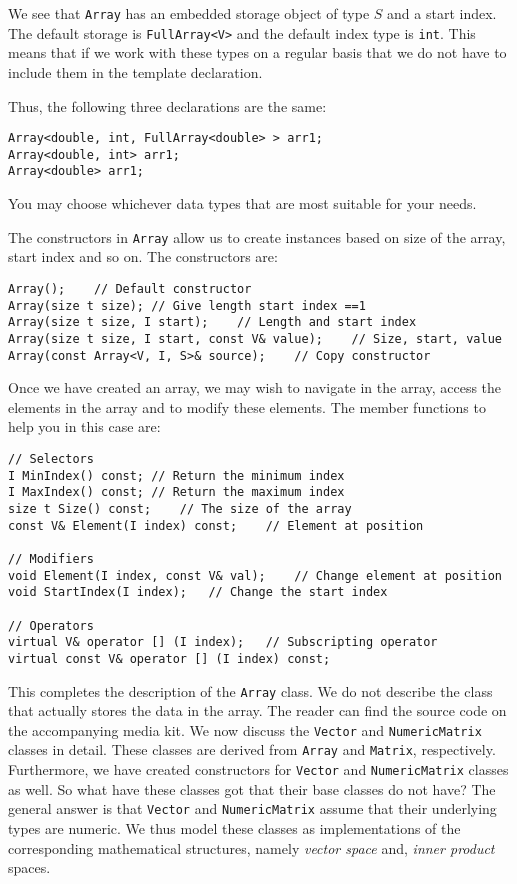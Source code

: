 We see that \texttt{Array} has an embedded storage object of type $S$ and a start index. The default storage is \texttt{FullArray<V>} and the default index type is \texttt{int}. This means that if we work with these types on a regular basis that we do not have to include them in the template declaration.

Thus, the following three declarations are the same:
\begin{lstlisting}
Array<double, int, FullArray<double> > arr1;
Array<double, int> arr1;
Array<double> arr1;
\end{lstlisting}

You may choose whichever data types that are most suitable for your needs.

The constructors in \texttt{Array} allow us to create instances based on size of the array, start index and so on. The constructors are:

\begin{lstlisting}
Array();	// Default constructor
Array(size t size);	// Give length start index ==1
Array(size t size, I start);	// Length and start index
Array(size t size, I start, const V& value);	// Size, start, value
Array(const Array<V, I, S>& source);	// Copy constructor
\end{lstlisting}

Once we have created an array, we may wish to navigate in the array, access the elements in the array and to modify these elements. The member functions to help you in this case are:
\begin{lstlisting}
// Selectors
I MinIndex() const;	// Return the minimum index
I MaxIndex() const;	// Return the maximum index
size t Size() const;	// The size of the array
const V& Element(I index) const;	// Element at position

// Modifiers
void Element(I index, const V& val);	// Change element at position
void StartIndex(I index);	// Change the start index

// Operators
virtual V& operator [] (I index);	// Subscripting operator
virtual const V& operator [] (I index) const;
\end{lstlisting}
This completes the description of the \texttt{Array} class. We do not describe the class that actually stores the data in the array. The reader can find the source code on the accompanying media kit. We now discuss the \texttt{Vector} and \texttt{NumericMatrix} classes in detail. These classes are derived from \texttt{Array} and \texttt{Matrix}, respectively. Furthermore, we have created constructors for \texttt{Vector} and \texttt{NumericMatrix} classes as well. So what have these classes got that their base classes do
not have? The general answer is that \texttt{Vector} and \texttt{NumericMatrix} assume that their underlying types are numeric. We thus model these classes as implementations of the corresponding mathematical structures, namely \textit{vector space} and, \textit{inner product} spaces.

